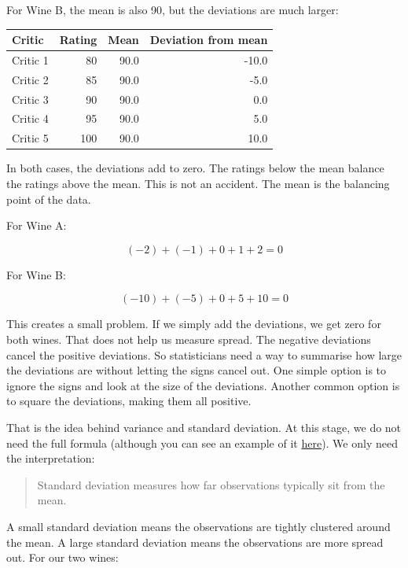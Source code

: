 \documentclass[
  letterpaper,
  DIV=11,
  numbers=noendperiod]{scrreprt}
\begin{document}
For Wine B, the mean is also 90, but the deviations are much larger:

\begin{table}
\fontsize{12.0pt}{14.0pt}\selectfont
\begin{tabular*}{\linewidth}{@{\extracolsep{\fill}}lrrr}
\toprule
Critic & Rating & Mean & Deviation from mean \\ 
\midrule\addlinespace[2.5pt]
Critic 1 & 80 & 90.0 & -10.0 \\ 
Critic 2 & 85 & 90.0 & -5.0 \\ 
Critic 3 & 90 & 90.0 & 0.0 \\ 
Critic 4 & 95 & 90.0 & 5.0 \\ 
Critic 5 & 100 & 90.0 & 10.0 \\ 
\bottomrule
\end{tabular*}
\end{table}

In both cases, the deviations add to zero. The ratings below the mean
balance the ratings above the mean. This is not an accident. The mean is
the balancing point of the data.

For Wine A:

\[
(-2) + (-1) + 0 + 1 + 2 = 0
\]

For Wine B:

\[
(-10) + (-5) + 0 + 5 + 10 = 0
\]

This creates a small problem. If we simply add the deviations, we get
zero for both wines. That does not help us measure spread. The negative
deviations cancel the positive deviations. So statisticians need a way
to summarise how large the deviations are without letting the signs
cancel out. One simple option is to ignore the signs and look at the
size of the deviations. Another common option is to square the
deviations, making them all positive.

That is the idea behind variance and standard deviation. At this stage,
we do not need the full formula (although you can see an example of it
\href{https://m2huynh.github.io/ETC1000/02-Analysing-numerical-data.html\#variance}{here}).
We only need the interpretation:

\begin{quote}
Standard deviation measures how far observations typically sit from the
mean.
\end{quote}

A small standard deviation means the observations are tightly clustered
around the mean. A large standard deviation means the observations are
more spread out. For our two wines:
\end{document}

